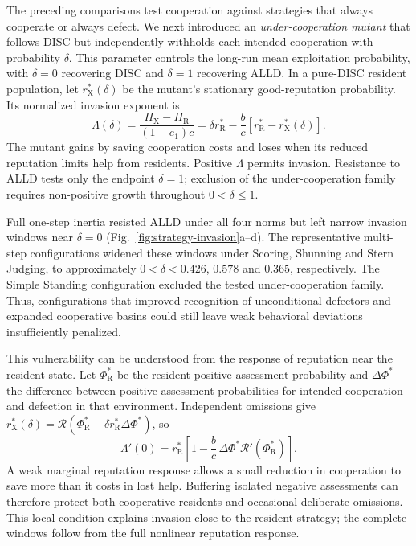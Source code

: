 \documentclass[fleqn,10pt]{wlscirep}
\begin{document}
The preceding comparisons test cooperation against strategies that always cooperate or always defect. We next introduced an \emph{under-cooperation mutant} that follows DISC but independently withholds each intended cooperation with probability $\delta$. This parameter controls the long-run mean exploitation probability, with $\delta=0$ recovering DISC and $\delta=1$ recovering ALLD. In a pure-DISC resident population, let $r_{\mathrm X}^{*}(\delta)$ be the mutant's stationary good-reputation probability. Its normalized invasion exponent is
\begin{equation}
\Lambda(\delta)
=\frac{\Pi_{\mathrm X}-\Pi_{\mathrm R}}{(1-e_1)c}
=\delta r_{\mathrm R}^{*}
-\frac bc\left[r_{\mathrm R}^{*}-r_{\mathrm X}^{*}(\delta)\right].
\label{eq:results-partial-invasion}
\end{equation}
The mutant gains by saving cooperation costs and loses when its reduced reputation limits help from residents. Positive $\Lambda$ permits invasion. Resistance to ALLD tests only the endpoint $\delta=1$; exclusion of the under-cooperation family requires non-positive growth throughout $0<\delta\leq1$.

Full one-step inertia resisted ALLD under all four norms but left narrow invasion windows near $\delta=0$ (Fig.~\ref{fig:strategy-invasion}a--d). The representative multi-step configurations widened these windows under Scoring, Shunning and Stern Judging, to approximately $0<\delta<0.426$, $0.578$ and $0.365$, respectively. The Simple Standing configuration excluded the tested under-cooperation family. Thus, configurations that improved recognition of unconditional defectors and expanded cooperative basins could still leave weak behavioral deviations insufficiently penalized.

This vulnerability can be understood from the response of reputation near the resident state. Let $\Phi_{\mathrm R}^{*}$ be the resident positive-assessment probability and $\Delta\Phi^{*}$ the difference between positive-assessment probabilities for intended cooperation and defection in that environment. Independent omissions give $r_{\mathrm X}^{*}(\delta)=\mathcal R(\Phi_{\mathrm R}^{*}-\delta r_{\mathrm R}^{*}\Delta\Phi^{*})$, so
\begin{equation}
\Lambda'(0)
=r_{\mathrm R}^{*}
\left[1-\frac bc\,\Delta\Phi^{*}
\mathcal R'(\Phi_{\mathrm R}^{*})\right].
\label{eq:results-local-gain}
\end{equation}
A weak marginal reputation response allows a small reduction in cooperation to save more than it costs in lost help. Buffering isolated negative assessments can therefore protect both cooperative residents and occasional deliberate omissions. This local condition explains invasion close to the resident strategy; the complete windows follow from the full nonlinear reputation response.
\end{document}
